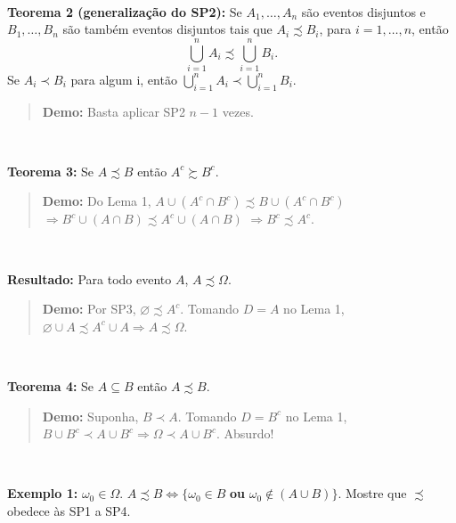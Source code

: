 \documentclass[
]{book}
\begin{document}
\(~\)

\textbf{Teorema 2 (generalização do SP2):}
Se \(A_1, \ldots, A_n\) são eventos disjuntos e \(B_1, \ldots, B_n\) são também eventos disjuntos tais que \(A_i \precsim B_i\), para \(i=1,\ldots,n\), então \[\bigcup_{i=1}^{n} A_i \precsim \bigcup_{i=1}^{n} B_i.\]
Se \(A_i \prec B_i\) para algum i, então \(\bigcup_{i=1}^{n} A_i \prec \bigcup_{i=1}^{n} B_i.\)

\begin{quote}
\textbf{Demo:} Basta aplicar SP2 \(n-1\) vezes.
\end{quote}

\(~\)

\textbf{Teorema 3:}
Se \(A \precsim B\) então \(A^c \succsim B^c\).

\begin{quote}
\textbf{Demo:} Do Lema 1, \(A \cup (A^c \cap B^c) \precsim B \cup (A^c \cap B^c)\) \(\Rightarrow B^c \cup (A \cap B) \precsim A^c \cup (A \cap B)\) \(\Rightarrow B^c \precsim A^c\).
\end{quote}

\(~\)

\textbf{Resultado:} Para todo evento \(A\), \(A \precsim \Omega\).

\begin{quote}
\textbf{Demo:} Por SP3, \(\varnothing \precsim A^c\). Tomando \(D=A\) no Lema 1, \(\varnothing \cup A \precsim A^c \cup A \Rightarrow A \precsim \Omega\).
\end{quote}

\(~\)

\textbf{Teorema 4:}
Se \(A \subseteq B\) então \(A \precsim B\).

\begin{quote}
\textbf{Demo:} Suponha, \(B \prec A\). Tomando \(D=B^c\) no Lema 1, \(B \cup B^c \prec A \cup B^c \Rightarrow \Omega \prec A \cup B^c\). Absurdo!
\end{quote}

\(~\)

\textbf{Exemplo 1:} \(\omega_0 \in \Omega\). \(A \precsim B \Leftrightarrow \{\omega_0 \in B\) \textbf{ou} \(\omega_0 \notin (A \cup B)\}\). Mostre que \(\precsim\) obedece às SP1 a SP4.
\end{document}

